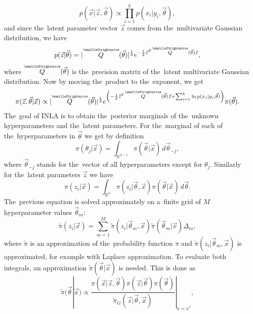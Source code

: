 \begin{equation}
    p(\vec{x}|\vec{z}, \vec{\theta}) \propto \prod_{i=1}^{k}p(x_i|y_i, \vec{\theta}),
\end{equation}
and since the~latent parameter vector $\vec{z}$ comes from the~multivariate Gaussian distribution, we have
\begin{equation}
    p(\vec{z}|\vec{\theta}) = |\tensor{Q}(\vec{\theta})|^{\frac{1}{2}} e^{-\frac{1}{2} \vec{z}^T \tensor{Q}(\vec{\theta}) \vec{z} },
\end{equation}
where $\tensor{Q}(\vec{\theta})$ is the~precision matrix of the~latent multivariate Gaussian distribution. Now by moving the~product to the~exponent, we get
\begin{equation}
    \pi(\vec{z}, \vec{\theta}|\vec{x}) \propto |\tensor{Q}(\vec{\theta})|^{\frac{1}{2}} e^{\left(-\frac{1}{2} \vec{z}^T \tensor{Q}(\vec{\theta}) \vec{z} + \sum_{i=1}^{k}\ln{p(x_i|y_i, \vec{\theta})} \right)} \pi(\vec{\theta}).
\end{equation}
The~goal of INLA is to obtain the~posterior marginals of the~unknown hyperparameters and the~latent parameters. For the~marginal of each of the~hyperparameters in $\vec{\theta}$ we get by definition
\begin{equation}
    \pi(\theta_j|\vec{x}) = \int_{\mathbb{R}^{n-1}}\pi(\vec{\theta}|\vec{x}) \, d\vec{\theta}_{-j}, 
\end{equation}
where $\vec{\theta}_{-j}$ stands for the~vector of all hyperparameters except for $\theta_j$. Similarly for the~latent parameters $\vec{z}$ we have
\begin{equation}
    \pi(z_i|\vec{x}) = \int_{\mathbb{R}^{n}} \pi(z_i|\vec{\theta},\vec{x}) \pi(\vec{\theta}|\vec{x}) \, d\vec{\theta}.
\end{equation}
The~previous equation is solved approximately on a~finite grid of $M$ hyperparameter values $\vec{\theta}_m$:
\begin{equation}
    \tilde{\pi}(z_i|\vec{x}) = \sum_{m=1}^M \tilde{\pi}(z_i|\vec{\theta}_m,\vec{x}) \tilde{\pi}(\vec{\theta}_m|\vec{x}) \Delta_m,
\end{equation}
where $\tilde{\pi}$ is an approximation of the~probability function $\pi$ and $\tilde{\pi}(z_i|\vec{\theta}_m,\vec{x})$ is approximated, for example with Laplace approximation. To evaluate both integrals, an approximation $\tilde{\pi}(\vec{\theta}|\vec{x})$ is needed. This is done as 
\begin{equation}
    \tilde{\pi}(\vec{\theta}|\vec{x}) \propto \frac{ \pi(\vec{x}|\vec{z},\vec{\theta}) \pi(\vec{z}|\vec{\theta}) \pi(\vec{\theta})}{\tilde{\pi}_G(\vec{z}|\vec{\theta},\vec{x})}|_{x=x^*},
\end{equation}
